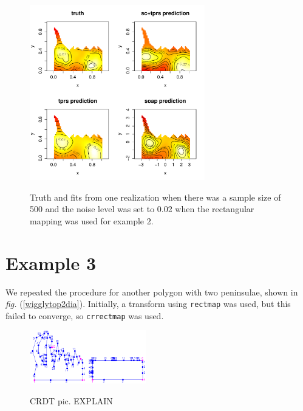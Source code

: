 \documentclass[a4paper,10pt]{amsart}
\newcommand{\fig}[1]{\emph{fig.} (\ref{#1})}
\begin{document}
\begin{figure}
\centering
\includegraphics[width=3in]{figs-otherdomains/wigglytop-real.pdf} \\
\caption{Truth and fits from one realization when there was a sample size of 500 and the noise level was set to 0.02 when the rectangular mapping was used for example 2. }
\label{wigglytop-real}
\end{figure}





\section{Example 3}

We repeated the procedure for another polygon with two peninsulae, shown in \fig{wigglytop2dia}. Initially, a transform using \texttt{rectmap} was used, but this failed to converge, so \texttt{crrectmap} was used.

\begin{figure}
\centering
\includegraphics[width=2in]{figs-otherdomains/wigglytop2-numbered.png} \\
\caption{CRDT pic. EXPLAIN}
\label{wigglytop2-numbered}
\end{figure}
\end{document}
